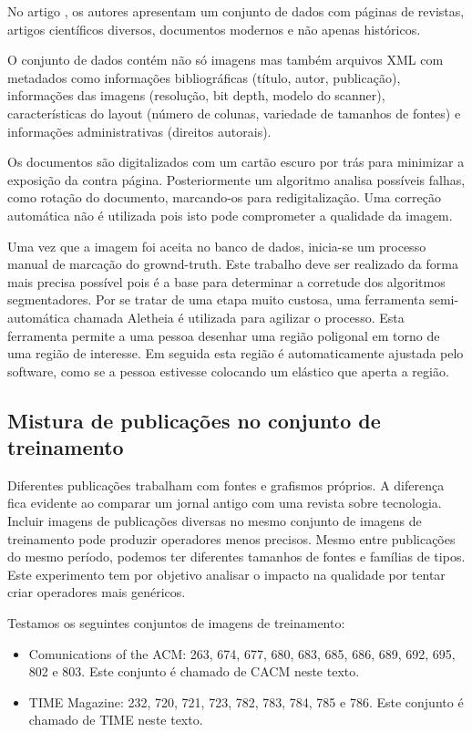 \documentclass[a4paper,11pt]{article}
\begin{document}
    No artigo \cite{Antonacopoulos09arealistic}, os autores apresentam um conjunto de dados com páginas de revistas, artigos científicos diversos, documentos modernos e não apenas históricos.

    O conjunto de dados contém não só imagens mas também arquivos XML \cite{pletschacher2010page} com metadados como informações bibliográficas (título, autor, publicação), informações das imagens (resolução, bit depth, modelo do scanner), características do layout (número de colunas, variedade de tamanhos de fontes) e informações administrativas (direitos autorais).

    Os documentos são digitalizados com um cartão escuro por trás para minimizar a exposição da contra página. Posteriormente um algoritmo analisa possíveis falhas, como rotação do documento, marcando-os para redigitalização. Uma correção automática não é utilizada pois isto pode comprometer a qualidade da imagem.

    Uma vez que a imagem foi aceita no banco de dados, inicia-se um processo manual de marcação do grownd-truth. Este trabalho deve ser realizado da forma mais precisa possível pois é a base para determinar a corretude dos algoritmos segmentadores. Por se tratar de uma etapa muito custosa, uma ferramenta semi-automática chamada Aletheia \cite{clausner2011aletheia} é utilizada para agilizar o processo. Esta ferramenta permite a uma pessoa desenhar uma região poligonal em torno de uma região de interesse. Em seguida esta região é automaticamente ajustada pelo software, como se a pessoa estivesse colocando um elástico que aperta a região.

  \subsection{Mistura de publicações no conjunto de treinamento}

    Diferentes publicações trabalham com fontes e grafismos próprios. A diferença fica evidente ao comparar um jornal antigo com uma revista sobre tecnologia. Incluir imagens de publicações diversas no mesmo conjunto de imagens de treinamento pode produzir operadores menos precisos. Mesmo entre publicações do mesmo período, podemos ter diferentes tamanhos de fontes e famílias de tipos. Este experimento tem por objetivo analisar o impacto na qualidade por tentar criar operadores mais genéricos.

    Testamos os seguintes conjuntos de imagens de treinamento:

    \begin{itemize}
      \item Comunications of the ACM: 263, 674, 677, 680, 683, 685, 686, 689, 692, 695, 802 e 803. Este conjunto é chamado de CACM neste texto.
      \item TIME Magazine: 232, 720, 721, 723, 782, 783, 784, 785 e 786. Este conjunto é chamado de TIME neste texto.
    \end{itemize}
\end{document}
